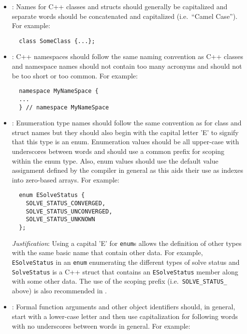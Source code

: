 \begin{itemize}


{}\item\NCClassNames: Names for C++ classes and structs should
generally be capitalized and separate words should be concatenated and
capitalized (i.e.\ ``Camel Case'').  For example:

{\small\begin{verbatim}
  class SomeClass {...};
\end{verbatim}}

{}\item\NCNamespaceNames: C++ namespaces should follow the same naming
convention as C++ classes and namespace names should not contain too many
acronyms and should not be too short or too common.  For example:

{\small\begin{verbatim}
  namespace MyNameSpace {
  ...
  } // namespace MyNameSpace 
\end{verbatim}}


{}\item\NCEnumNames: Enumeration type names should follow the same convention
as for class and struct names but they should also begin with the capital
letter 'E' to signify that this type is an enum.  Enumeration values should be
all upper-case with underscores between words and should use a common prefix
for scoping within the enum type.  Also, enum values should use the default
value assignment defined by the compiler in general as this aids their use as
indexes into zero-based arrays.  For example:

{\small\begin{verbatim}
  enum ESolveStatus {
    SOLVE_STATUS_CONVERGED,
    SOLVE_STATUS_UNCONVERGED,
    SOLVE_STATUS_UNKNOWN
  };
\end{verbatim}}


{}\textit{Justification}: Using a capital 'E' for {}\texttt{enum}s allows the
definition of other types with the same basic name that contain other data.
For example, {}\texttt{ESolveStatus} in an {}\texttt{enum} enumerating the
different types of solve status and {}\texttt{SolveStatus} is a C++ struct
that contains an {}\texttt{ESolveStatus} member along with some other data.
The use of the scoping prefix (i.e.\ {}\texttt{SOLVE\-\_STATUS\_} above) is
also recommended in {}\cite[Section 11.4]{CodeComplete2nd04}.


{}\item\NCObjectNames: Formal function arguments and other object identifiers
should, in general, start with a lower-case letter and then use capitalization
for following words with no underscores between words in general.  For
example:


\end{itemize}
